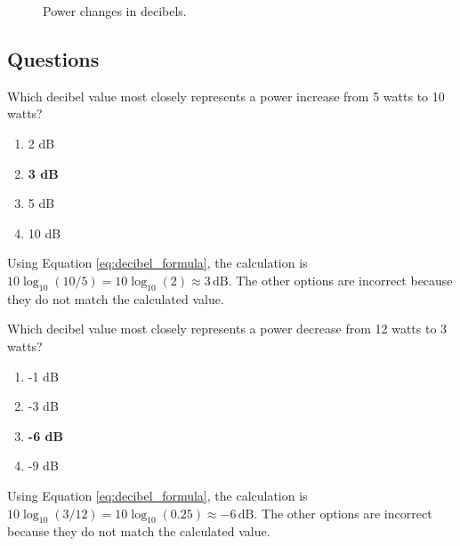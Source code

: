 \begin{figure}[h]
    \centering
    \caption{Power changes in decibels.}
    \label{fig:decibel_power}
\end{figure}

\subsection*{Questions}
\begin{tcolorbox}[colback=gray!10!white,colframe=black!75!black,title={T5B09}]
    Which decibel value most closely represents a power increase from 5 watts to 10 watts?
    \begin{enumerate}[label=\Alph*,noitemsep]
        \item 2 dB
        \item \textbf{3 dB}
        \item 5 dB
        \item 10 dB
    \end{enumerate}
\end{tcolorbox}
Using Equation \ref{eq:decibel_formula}, the calculation is \( 10 \log_{10}(10/5) = 10 \log_{10}(2) \approx 3 \, \text{dB} \). The other options are incorrect because they do not match the calculated value.


\begin{tcolorbox}[colback=gray!10!white,colframe=black!75!black,title={T5B10}]
    Which decibel value most closely represents a power decrease from 12 watts to 3 watts?
    \begin{enumerate}[label=\Alph*,noitemsep]
        \item -1 dB
        \item -3 dB
        \item \textbf{-6 dB}
        \item -9 dB
    \end{enumerate}
\end{tcolorbox}
Using Equation \ref{eq:decibel_formula}, the calculation is \( 10 \log_{10}(3/12) = 10 \log_{10}(0.25) \approx -6 \, \text{dB} \). The other options are incorrect because they do not match the calculated value.

